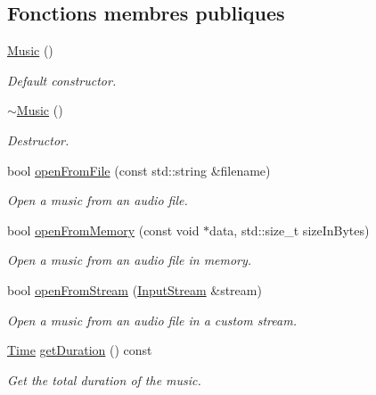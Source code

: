 \subsection*{Fonctions membres publiques}
\begin{DoxyCompactItemize}
\item 
\mbox{\label{classsf_1_1Music_a0bc787d8e022b3a9b89cf2c28befd42e}} 
\hyperlink{classsf_1_1Music_a0bc787d8e022b3a9b89cf2c28befd42e}{Music} ()
\begin{DoxyCompactList}\small\item\em Default constructor. \end{DoxyCompactList}\item 
\mbox{\label{classsf_1_1Music_a4c65860fed2f01d0eaa6c4199870414b}} 
\hyperlink{classsf_1_1Music_a4c65860fed2f01d0eaa6c4199870414b}{$\sim$\+Music} ()
\begin{DoxyCompactList}\small\item\em Destructor. \end{DoxyCompactList}\item 
bool \hyperlink{classsf_1_1Music_a3edc66e5f5b3f11e84b90eaec9c7d7c0}{open\+From\+File} (const std\+::string \&filename)
\begin{DoxyCompactList}\small\item\em Open a music from an audio file. \end{DoxyCompactList}\item 
bool \hyperlink{classsf_1_1Music_ae93b21bcf28ff0b5fec458039111386e}{open\+From\+Memory} (const void $\ast$data, std\+::size\+\_\+t size\+In\+Bytes)
\begin{DoxyCompactList}\small\item\em Open a music from an audio file in memory. \end{DoxyCompactList}\item 
bool \hyperlink{classsf_1_1Music_a4e55d1910a26858b44778c26b237d673}{open\+From\+Stream} (\hyperlink{classsf_1_1InputStream}{Input\+Stream} \&stream)
\begin{DoxyCompactList}\small\item\em Open a music from an audio file in a custom stream. \end{DoxyCompactList}\item 
\hyperlink{classsf_1_1Time}{Time} \hyperlink{classsf_1_1Music_a288ef6f552a136b0e56952dcada3d672}{get\+Duration} () const
\begin{DoxyCompactList}\small\item\em Get the total duration of the music. \end{DoxyCompactList}\end{DoxyCompactItemize}

